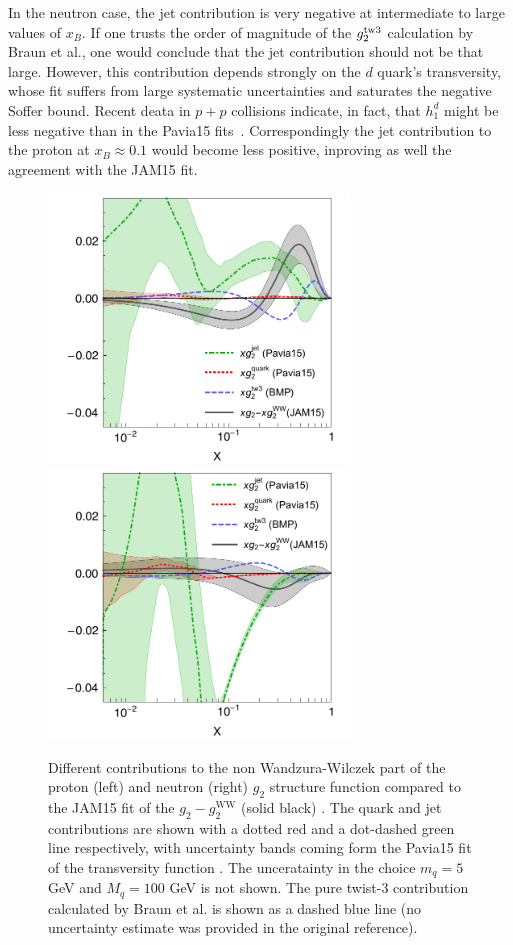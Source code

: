 \documentclass[preprintnumbers,floatfix,nofootinbib]{revtex4}
\newcommand{\xbj}{{x_B}}                   %
\newcommand{\mj}{M_q}
\begin{document}
In the neutron case, the jet contribution is very negative at intermediate to
large values of $\xbj$. 
If one trusts the order of magnitude of the $g_2^{\rm tw3}$
calculation by Braun et al., one would conclude that the jet contribution
should not be that large. However, this contribution depends strongly on the $d$ quark's transversity, whose fit suffers from large systematic uncertainties and saturates the negative Soffer bound. Recent deata in $p+p$ collisions indicate, in fact, that $h_1^d$ might be less negative than in the Pavia15
fits~\cite{Radici:2016lam}.
Correspondingly the jet contribution to the proton at $\xbj \approx 0.1$
would become less positive, inproving as well the agreement with the JAM15
fit. 

\begin{figure}[htb]
\begin{center}
\includegraphics[width=8cm]{g2contrib}
\includegraphics[width=8cm]{g2contribN}
\caption{\label{f:g2contrib} 
Different contributions to the non Wandzura-Wilczek part of the proton (left)
and neutron (right) $g_2$ structure function compared to the JAM15 fit of the
$g_2-g_2^{\text{WW}}$ (solid black) \cite{Sato:2016tuz}. The quark and jet
contributions are shown with a dotted red and a dot-dashed green line
respectively, with uncertainty bands coming form the Pavia15 fit of the
transversity function \cite{Radici:2015mwa}. The unceratainty in the choice
$m_q=5$ GeV and $\mj=100$ GeV is not shown. The pure twist-3 contribution
calculated by Braun et al. \cite{Braun:2011aw} is shown as a dashed blue line
(no uncertainty estimate was provided in the original reference). 
}
\end{center}
\end{figure}
\end{document}
